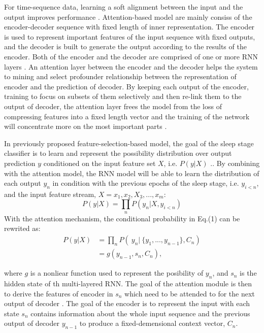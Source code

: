 \documentclass[journal]{IEEEtran}
\begin{document}
For time-sequence data, learning a soft alignment between the input and the output improves performance \cite{bahdanau2014neural}. Attention-based model are mainly consiss of the encoder-decoder sequence with fixed length of inner representation. The encoder is used to represent important features of the input sequence with fixed outputs, and the decoder is built to generate the output according to the results of the encoder. Both of the encoder and the decoder are comprised of one or more RNN layers \cite{prabhavalkar2017analysis}. An attention layer between the encoder and the decoder helps the system to mining and select profounder relationship between the representation of encoder and the prediction of decoder. By keeping each output of the encoder, training to focus on subsets of them selectively and then re-link them to the output of decoder, the attention layer frees the model from the loss of compressing features into a fixed length vector and the training of the network will concentrate more on the most important parts \cite{bahdanau2014neural} .

In previously proposed feature-selection-based model, the goal of the sleep stage classifier is to learn and represent the possibility distribution over output prediction $y$ conditioned on the input feature set $X$, i.e. $P(y|X)$ \cite{prabhavalkar2017analysis}.. By combining with the attention model, the RNN model will be able to learn the distribution of each output $y_n$ in condition with the previous epochs of the sleep stage, i.e. $y_{i<n}$, and the input feature stream, $X = {x_1, x_2, X_3, ..., x_m}$:
\begin{equation}
P(y|X) = \prod_n P(y_n|X,y_{i<n})
\end{equation}
With the attention mechanism, the conditional probability in Eq.(1) can be rewrited as:
\begin{equation}
\begin{aligned}
P(y|X) &= \prod_n P(\ y_n|\ \{y_1, ..., y_{n-1}\},C_n)\\
&= g(y_{n-1}, s_n, C_n),
\end{aligned}
\end{equation}

where $g$ is a nonliear function used to represent the posibility of $y_n$, and $s_n$ is the hidden state of th multi-layered RNN. The goal of the attention module is then to derive the features of encoder in $s_n$ which need to be attended to for the next output of decoder \cite{prabhavalkar2017analysis}. The goal of the encoder is to represent the input with each state $s_n$ contains information about the whole input sequence and the previous output of decoder $y_{n-1}$ to produce a fixed-demensional context vector, $C_n$. 
\end{document}
